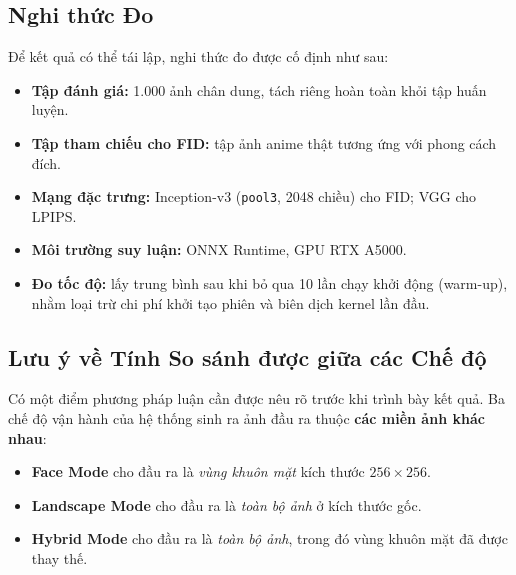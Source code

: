 \subsection{Nghi thức Đo}
\label{subsec:eval_protocol}

Để kết quả có thể tái lập, nghi thức đo được cố định như sau:

\begin{itemize}
    \item \textbf{Tập đánh giá:} 1.000 ảnh chân dung, tách riêng hoàn toàn khỏi tập huấn luyện.
    \item \textbf{Tập tham chiếu cho FID:} tập ảnh anime thật tương ứng với phong cách đích.
    \item \textbf{Mạng đặc trưng:} Inception-v3 (\texttt{pool3}, 2048 chiều) cho FID; VGG cho LPIPS.
    \item \textbf{Môi trường suy luận:} ONNX Runtime, GPU RTX A5000.
    \item \textbf{Đo tốc độ:} lấy trung bình sau khi bỏ qua 10 lần chạy khởi động (warm-up), nhằm loại trừ chi phí khởi tạo phiên và biên dịch kernel lần đầu.
\end{itemize}


\subsection{Lưu ý về Tính So sánh được giữa các Chế độ}
\label{subsec:comparability}

Có một điểm phương pháp luận cần được nêu rõ trước khi trình bày kết quả. Ba chế độ vận hành của hệ thống sinh ra ảnh đầu ra thuộc \textbf{các miền ảnh khác nhau}:

\begin{itemize}
    \item \textbf{Face Mode} cho đầu ra là \textit{vùng khuôn mặt} kích thước $256\times256$.
    \item \textbf{Landscape Mode} cho đầu ra là \textit{toàn bộ ảnh} ở kích thước gốc.
    \item \textbf{Hybrid Mode} cho đầu ra là \textit{toàn bộ ảnh}, trong đó vùng khuôn mặt đã được thay thế.
\end{itemize}

